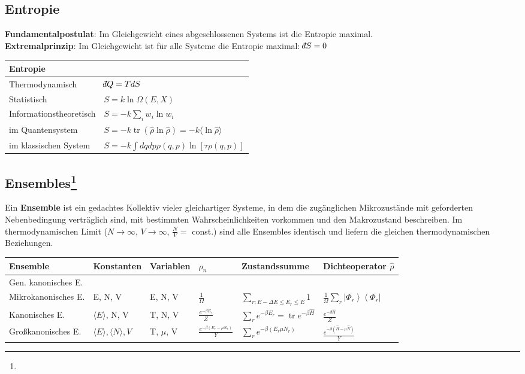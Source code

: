 \documentclass[12pt,a4paper]{article}
\DeclareMathOperator{\tr}{tr}
\newcommand{\ket}[1]{\left| #1 \right>}
\newcommand{\bra}[1]{\left< #1 \right|}
\renewcommand{\=}[1]{\stackrel{#1}{=}}
\def\dbar{{\mathchar'26\mkern-12mu d}}
\newcommand{\erw}[1]{\langle #1 \rangle}
\def\dbar{{\mathchar'26\mkern-12mu d}}
\theoremstyle{definition}
\theoremstyle{remark}
\begin{document}
\subsection{Entropie}

\textbf{Fundamentalpostulat}: Im Gleichgewicht eines abgeschlossenen Systems ist die Entropie maximal.\\
\textbf{Extremalprinzip}: Im Gleichgewicht ist für alle Systeme die Entropie maximal: $\dbar S = 0$

\begin{flushleft}
\begin{tabular}{ll}
\toprule
Entropie & \\
\midrule
Thermodynamisch & $\dbar Q = T dS$\\
Statistisch & $S = k \ln \Omega(E, X)$\\
Informationstheoretisch & $S = - k \sum_i w_i \ln w_i$\\
\midrule
im Quantensystem & $S = -k \tr(\hat \rho \ln \hat \rho) = -k \langle \ln \hat \rho \rangle$\\
im klassischen System & $S = -k \int dq dp \rho(q, p) \ln [\tau \rho(q, p)]$\\
\bottomrule
\end{tabular}
\end{flushleft}

\subsection[Ensembles]{Ensembles\let\thefootnote\relax\footnote{}}

Ein \textbf{Ensemble} ist ein gedachtes Kollektiv vieler gleichartiger Systeme, in dem die zugänglichen Mikrozustände mit geforderten Nebenbedingung verträglich sind, mit bestimmten Wahrscheinlichkeiten vorkommen und den Makrozustand beschreiben. Im thermodynamischen Limit ($N \longrightarrow \infty$, $V \longrightarrow \infty$, $\frac{N}{V} = $ const.) sind alle Ensembles identisch und liefern die gleichen thermodynamischen Beziehungen.\\

\noindent \begin{tabular}{llllll}
\toprule
Ensemble & Konstanten & Variablen & $\rho_n$ & Zustandssumme & Dichteoperator $\hat \rho$\\
\midrule
Gen. kanonisches E. & & & & & \\
Mikrokanonisches E. & E, N, V & E, N, V & $\frac{1}{\Omega}$ & $\sum_{r: E-\Delta E \leq E_r \leq E} 1$ & $\frac{1}{\Omega} \sum_r \ket{\Phi_r}\bra{\Phi_r}$\\
Kanonisches E. & $\langle E \rangle$, N, V & T, N, V & $\frac{e^{-\beta E_r}}{Z}$ & $\sum_r e^{-\beta E_r} = \tr e^{-\beta \hat H}$ & $\frac{e^{-\beta \hat H}}{Z}$\\
Großkanonisches E. & $\erw{E}, \erw{N}, V$ &  T, $\mu$, V &  $\frac{e^{-\beta(E_r - \mu N_r)}}{Y}$ & $\sum_r e^{-\beta(E_r \mu N_r)}$ & $\frac{e^{-\beta(\hat H - \mu \hat N)}}{Y}$\\
\bottomrule
\end{tabular}
\end{document}

